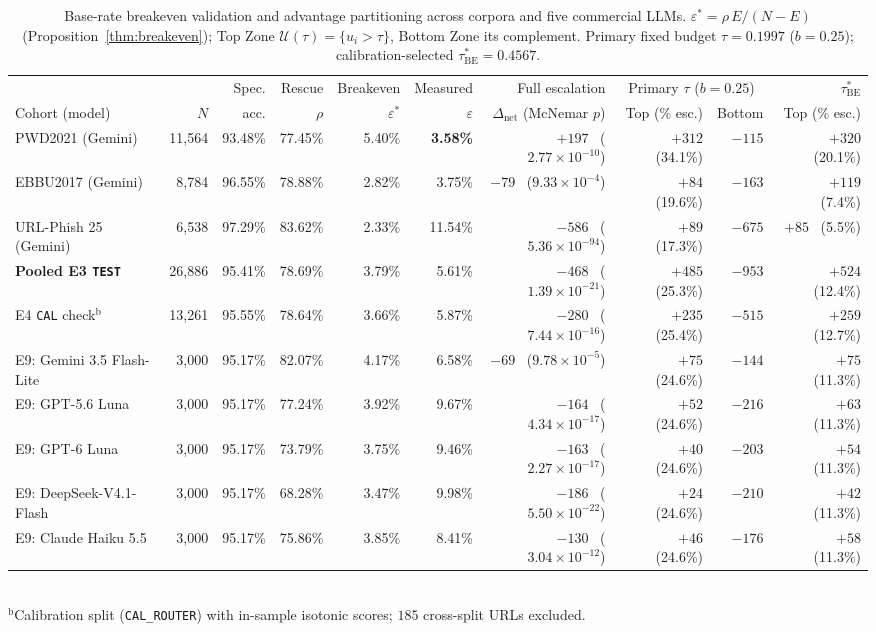 \documentclass[conference,a4paper]{IEEEtran}
\newcommand{\eps}{\varepsilon}
\newcommand{\epsstar}{\eps^{\ast}}
\newcommand{\rrescue}{\rho}
\begin{document}
\begin{table}[!t]
\caption{Base-rate breakeven validation and advantage partitioning across corpora and
five commercial LLMs. $\epsstar=\rrescue\,E/(N{-}E)$ (Proposition~\ref{thm:breakeven});
Top Zone $\mathcal{U}(\tau)=\{u_i>\tau\}$, Bottom Zone its complement. Primary fixed
budget $\tau=0.1997$ ($b=0.25$); calibration-selected $\tau^{\ast}_{\mathrm{BE}}=0.4567$.}
\label{tab:breakeven}
\centering
\scriptsize
\setlength{\tabcolsep}{3.6pt}
\begin{tabular}{lrrrrrrrrr}
\toprule
& & Spec. & Rescue & Breakeven & Measured & Full escalation & \multicolumn{2}{c}{Primary $\tau$ ($b{=}0.25$)} & $\tau^{\ast}_{\mathrm{BE}}$ \\
\cmidrule(lr){8-9}\cmidrule(lr){10-10}
Cohort (model) & $N$ & acc. & $\rrescue$ & $\epsstar$ & $\eps$ &
$\Delta_{\mathrm{net}}$ (McNemar $p$) & Top (\% esc.) & Bottom & Top (\% esc.) \\
\midrule
PWD2021 (Gemini) & 11{,}564 & 93.48\% & 77.45\% & 5.40\% & \textbf{3.58\%} & $+197$ \ ($2.77\times10^{-10}$) & $+312$ \ (34.1\%) & $-115$ & $+320$ \ (20.1\%) \\
EBBU2017 (Gemini) & 8{,}784 & 96.55\% & 78.88\% & 2.82\% & 3.75\% & $-79$ \ ($9.33\times10^{-4}$) & $+84$ \ (19.6\%) & $-163$ & $+119$ \ (7.4\%) \\
URL-Phish 25 (Gemini) & 6{,}538 & 97.29\% & 83.62\% & 2.33\% & 11.54\% & $-586$ \ ($5.36\times10^{-94}$) & $+89$ \ (17.3\%) & $-675$ & $+85$ \ (5.5\%) \\
\midrule
\textbf{Pooled E3 \texttt{TEST}} & 26{,}886 & 95.41\% & 78.69\% & 3.79\% & 5.61\% & $-468$ \ ($1.39\times10^{-21}$) & $+485$ \ (25.3\%) & $-953$ & $+524$ \ (12.4\%) \\
E4 \texttt{CAL} check$^{\mathrm{b}}$ & 13{,}261 & 95.55\% & 78.64\% & 3.66\% & 5.87\% & $-280$ \ ($7.44\times10^{-16}$) & $+235$ \ (25.4\%) & $-515$ & $+259$ \ (12.7\%) \\
\midrule
E9: Gemini 3.5 Flash-Lite & 3{,}000 & 95.17\% & 82.07\% & 4.17\% & 6.58\% & $-69$ \ ($9.78\times10^{-5}$) & $+75$ \ (24.6\%) & $-144$ & $+75$ \ (11.3\%) \\
E9: GPT-5.6 Luna & 3{,}000 & 95.17\% & 77.24\% & 3.92\% & 9.67\% & $-164$ \ ($4.34\times10^{-17}$) & $+52$ \ (24.6\%) & $-216$ & $+63$ \ (11.3\%) \\
E9: GPT-6 Luna & 3{,}000 & 95.17\% & 73.79\% & 3.75\% & 9.46\% & $-163$ \ ($2.27\times10^{-17}$) & $+40$ \ (24.6\%) & $-203$ & $+54$ \ (11.3\%) \\
E9: DeepSeek-V4.1-Flash & 3{,}000 & 95.17\% & 68.28\% & 3.47\% & 9.98\% & $-186$ \ ($5.50\times10^{-22}$) & $+24$ \ (24.6\%) & $-210$ & $+42$ \ (11.3\%) \\
E9: Claude Haiku 5.5 & 3{,}000 & 95.17\% & 75.86\% & 3.85\% & 8.41\% & $-130$ \ ($3.04\times10^{-12}$) & $+46$ \ (24.6\%) & $-176$ & $+58$ \ (11.3\%) \\
\bottomrule
\end{tabular}\\[2pt]
{\scriptsize $^{\mathrm{b}}$Calibration split (\texttt{CAL\_ROUTER}) with in-sample isotonic scores; $185$ cross-split URLs excluded.}
\end{table}
\end{document}
